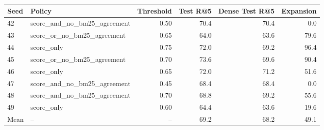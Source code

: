 \begin{tabular}{llrrrr}
\toprule
Seed & Policy & Threshold & Test R@5 & Dense Test R@5 & Expansion \\
\midrule
42 & score\_and\_no\_bm25\_agreement & 0.50 & 70.4 & 70.4 & 0.0 \\
43 & score\_or\_no\_bm25\_agreement & 0.65 & 64.0 & 63.6 & 79.6 \\
44 & score\_only & 0.75 & 72.0 & 69.2 & 96.4 \\
45 & score\_or\_no\_bm25\_agreement & 0.70 & 73.6 & 69.6 & 90.4 \\
46 & score\_only & 0.65 & 72.0 & 71.2 & 51.6 \\
47 & score\_and\_no\_bm25\_agreement & 0.45 & 68.4 & 68.4 & 0.0 \\
48 & score\_and\_no\_bm25\_agreement & 0.70 & 68.8 & 69.2 & 55.6 \\
49 & score\_only & 0.60 & 64.4 & 63.6 & 19.6 \\
\midrule
Mean & -- & -- & 69.2 & 68.2 & 49.1 \\
\bottomrule
\end{tabular}
